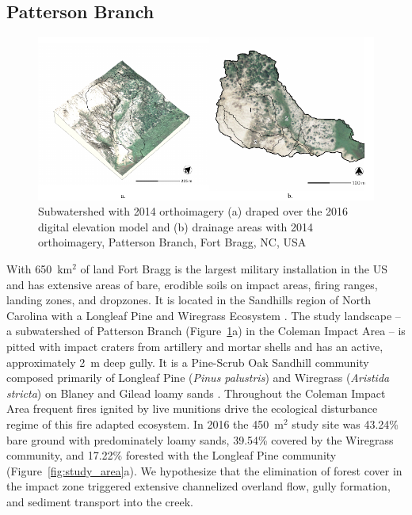\documentclass[gmd, manuscript]{copernicus}
\begin{document}
\subsection{Patterson Branch}

\begin{figure}
\center
\includegraphics[width=\textwidth,height=0.95\textheight,keepaspectratio]{figures/watershed.pdf}
\caption{Subwatershed with 2014 orthoimagery
(a) draped over the 2016 digital elevation model
and (b) drainage areas with 2014 orthoimagery, Patterson Branch, Fort Bragg, NC, USA}
\label{fig:watershed}
\end{figure}

With 650~\unit{km}$^{2}$ of land
Fort Bragg is the largest military installation in the US
and has extensive areas of bare, erodible soils
on impact areas, firing ranges, landing zones, and dropzones. 
It is located in the Sandhills region of North Carolina 
with a Longleaf Pine and Wiregrass Ecosystem \citep{Sorrie2006}.
%
The study landscape 
-- a subwatershed of Patterson Branch (Figure~\ref{fig:watershed}a) 
in the Coleman Impact Area --
is pitted with impact craters from artillery and mortar shells
and has an active, approximately 2~\unit{m} deep gully. 
%
It is a Pine-Scrub Oak Sandhill community
composed primarily of Longleaf Pine (\emph{Pinus palustris})
and Wiregrass (\emph{Aristida stricta})
on Blaney and Gilead loamy sands 
\citep{Sorrie2004}. 
%
Throughout the Coleman Impact Area
frequent fires ignited by live munitions
drive the ecological disturbance regime
of this fire adapted ecosystem.
%
In 2016 the  450~\unit{m}$^{2}$ study site was
43.24\% bare ground with predominately loamy sands,
39.54\% covered by the Wiregrass community, and
17.22\% forested with the Longleaf Pine community 
(Figure~\ref{fig:study_area}a). 
%
We hypothesize that the elimination of forest cover
in the impact zone
triggered extensive channelized overland flow,
gully formation, and sediment transport into the creek. 
\end{document}
